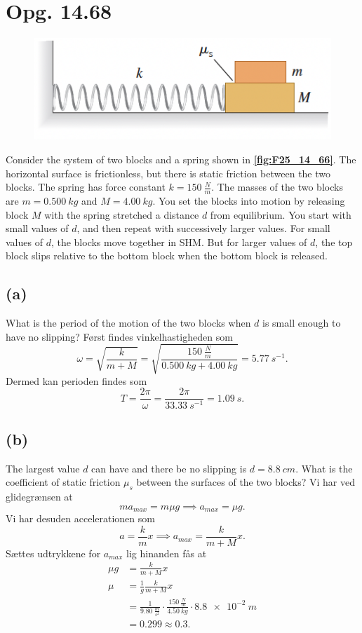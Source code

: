 \documentclass[12pt]{article}
\theoremstyle{definition}
\begin{document}
\section*{Opg. 14.68}
\begin{figure} [ht]
  \centering
  \caption{}
  \includegraphics[width=0.5\linewidth]{../figures/F25_14_66.png}
  \label{fig:F25_14_66}
\end{figure}

Consider the system of two blocks and a spring shown in \textbf{\autoref{fig:F25_14_66}}. The horizontal surface is frictionless, but there is static friction between the two blocks. The spring has force constant $k = \qty{150}{\frac{N}{m}}$. The masses of the two blocks are $m = \qty{0,500}{kg}$ and $M = \qty{4,00}{kg}$. You set the blocks into motion by releasing block $M$ with the spring stretched a distance $d$ from equilibrium. You start with small values of $d$, and then repeat with successively larger values. For small values of $d$, the blocks move together in SHM. But for larger values of $d$, the top block slips relative to the bottom block when the bottom block is released.

\subsection*{(a)}
What is the period of the motion of the two blocks when $d$ is small enough to have no slipping?
\bigbreak
Først findes vinkelhastigheden som
\[ 
\omega = \sqrt{\frac{k}{m+M}} = \sqrt{\frac{\qty{150}{\frac{N}{m}}}{\qty{0,500}{kg} + \qty{4,00}{kg}}} = \qty{5,77}{s^{-1}} 
.\]
Dermed kan perioden findes som
\[ 
T = \frac{2\pi}{\omega} = \frac{2\pi}{\qty{33,33}{s^{-1}}} = \qty{1,09}{s} 
.\]


\subsection*{(b)}
The largest value $d$ can have and there be no slipping is $d = \qty{8,8}{cm}$. What is the coefficient of static friction $\mu_s$ between the surfaces of the two blocks?
\bigbreak
Vi har ved glidegrænsen at
\[ 
ma_{max} = m \mu g \implies a_{max} = \mu g
.\]
Vi har desuden accelerationen som
\[ 
a = \frac{k}{m}x \implies a_{max} = \frac{k}{m+M}x
.\]
Sættes udtrykkene for $a_{max}$ lig hinanden fås at
\begin{align*}
  \mu g &= \frac{k}{m+M}x \\
  \mu &= \frac{1}{g} \frac{k}{m+M}x \\
    &= \frac{1}{\qty{9,80}{\frac{m}{s^2}}} \cdot \frac{\qty{150}{\frac{N}{m}}}{\qty{4,50}{kg}} \cdot \qty{8,8e-2}{m} \\
    &= \num{0,299} \approx \num{0,3} 
.\end{align*}
\end{document}
